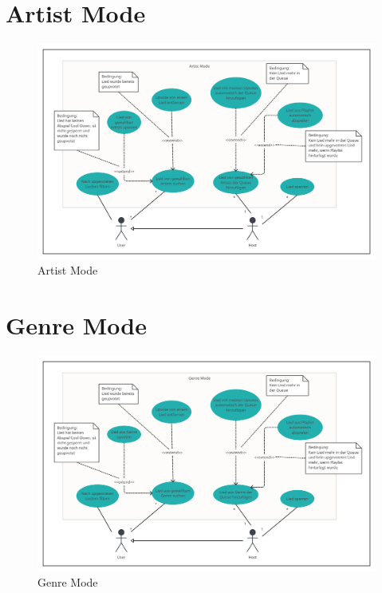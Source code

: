 \documentclass[oneside, ngerman]{sdqtechreport}
\begin{document}
\newpage

\section{Artist Mode}
\label{sec:Anwendungsfälle:Artist Mode}

\begin{figure}[h]
    \includegraphics[width = 18cm]{LATEX/Pflichtenheft/GraphicDesigns/Use Case Artist Mode.png}
    \caption{Artist Mode}
    \label{fig:Use Case Artist Mode}
\end{figure}

\newpage

\section{Genre Mode}
\label{sec:Anwendungsfälle:Genre Mode}

\begin{figure}[h]
    \includegraphics[width = 18cm]{LATEX/Pflichtenheft/GraphicDesigns/Use Case Genre Mode.png}
    \caption{Genre Mode}
    \label{fig:Use Case Genre Mode}
\end{figure}
\end{document}
